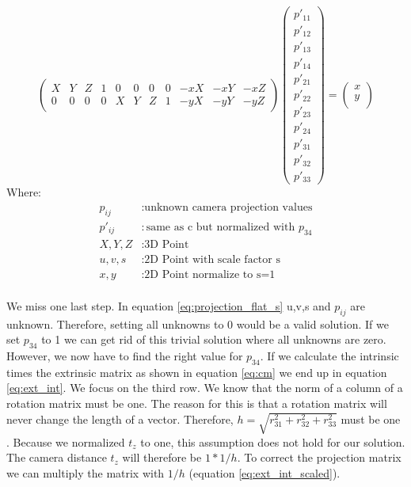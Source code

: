 \documentclass[11pt,a4paper,titlepage,oneside]{report}
\begin{document}
\begin{equation}\label{eq:projection_flat_red}
	\begin{pmatrix}
		X & Y & Z & 1 & 0 & 0 & 0 & 0 & -xX & -xY & -xZ\\
		0 & 0 & 0 & 0 & X & Y & Z & 1 & -yX & -yY & -yZ
	\end{pmatrix}
	\begin{pmatrix}
		p'_{11}\\
		p'_{12}\\
		p'_{13}\\
		p'_{14}\\
		p'_{21}\\
		p'_{22}\\
		p'_{23}\\
		p'_{24}\\
		p'_{31}\\
		p'_{32}\\
		p'_{33}
	\end{pmatrix}=
	\begin{pmatrix}x\\
		y\\
	\end{pmatrix}
\end{equation}
Where:
\begin{align*}
	p_{ij}		&: \text{unknown camera projection values}\\
	p'_{ij}		&: \text{same as c but normalized with $p_{34}$}\\
	X,Y,Z			&: \text{3D Point}\\
	u,v,s			&: \text{2D Point with scale factor s}\\
	x,y				&: \text{2D Point normalize to s=1}\\
\end{align*}

We miss one last step. In equation \ref{eq:projection_flat_s} u,v,s and $p_{ij}$ are unknown. Therefore, setting all unknowns to 0 would be a valid solution. If we set $p_{34}$ to 1 we can get rid of this trivial solution where all unknowns are zero. However, we now have to find the right value for $p_{34}$. If we calculate the intrinsic times the extrinsic matrix as shown in equation \ref{eq:cm} we end up in equation \ref{eq:ext_int}. We focus on the third row. We know that the norm of a column of a rotation matrix must be one. The reason for this is that a rotation matrix will never change the length of a vector. Therefore, $h=\sqrt{r_{31}^2+r_{32}^2+r_{33}^2}$ must be one \cite{Wu}. Because we normalized $t_z$ to one, this assumption does not hold for our solution. The camera distance $t_z$ will therefore be $1*1/h$. To correct the projection matrix we can multiply the matrix with $1/h$ (equation \ref{eq:ext_int_scaled}).
\end{document}
